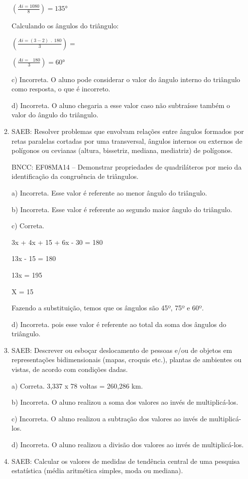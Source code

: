 \begin{enumerate}
$(\frac{Ai = 1080}{8}) = 135°$

Calculando os ângulos do triângulo:

$(\frac{Ai = \left( 3 - 2 \right)\ \ .\ \ 180}{3}) =$

$(\frac{Ai = \ \ \ 180}{3}) = 60°$

c) Incorreta. O aluno pode considerar o valor do ângulo interno do
triângulo como resposta, o que é incorreto.

d) Incorreta. O aluno chegaria a esse valor caso não subtraísse
também o valor do ângulo do triângulo.

\item SAEB: Resolver problemas que envolvam relações entre ângulos formados
por retas paralelas cortadas por uma transversal, ângulos internos ou
externos de polígonos ou cevianas (altura, bissetriz, mediana,
mediatriz) de polígonos.

BNCC: EF08MA14 -- Demonstrar propriedades de quadriláteros por meio da
identificação da congruência de triângulos.

a) Incorreta. Esse valor é referente ao menor ângulo do triângulo.

b) Incorreta. Esse valor é referente ao segundo maior ângulo do
triângulo.

c) Correta.

3x + 4x + 15 + 6x - 30 = 180

13x - 15 = 180

13x = 195

X = 15

Fazendo a substituição, temos que os ângulos são 45º, 75º e 60º.

d) Incorreta. pois esse valor é referente ao total da soma dos ângulos
do triângulo.

\item SAEB: Descrever ou esboçar deslocamento de pessoas e/ou de objetos em
representações bidimensionais (mapas, croquis etc.), plantas de
ambientes ou vistas, de acordo com condições dadas.

a) Correta. 3,337 x 78 voltas = 260,286 km.

b) Incorreta. O aluno realizou a soma dos valores ao invés de
multiplicá-los.

c) Incorreta. O aluno realizou a subtração dos valores ao invés de
multiplicá-los.

d) Incorreta. O aluno realizou a divisão dos valores ao invés
de multiplicá-los.

\item SAEB: Calcular os valores de medidas de tendência central de uma
pesquisa estatística (média aritmética simples, moda ou mediana).


\end{enumerate}
